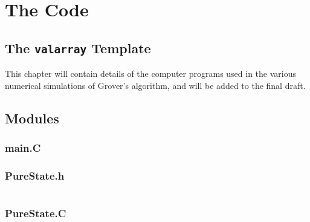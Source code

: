 
\chapter{The Code}
\label{chap:code}

\section{The \texttt{valarray} Template}

This chapter will contain details of the computer programs used
in the various numerical simulations of Grover's algorithm, and
will be added to the final draft.


\section{Modules}

\subsection{main.C}



\subsection{PureState.h}
\begin{verbatim}
\end{verbatim}

\subsection{PureState.C}
\begin{verbatim}
\end{verbatim}
